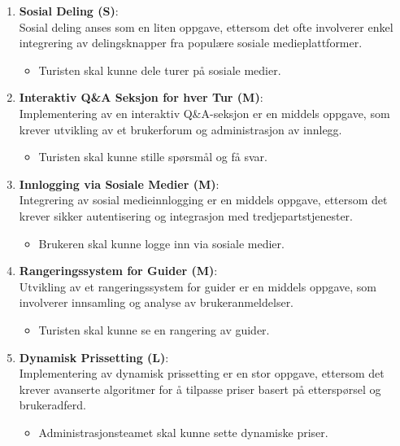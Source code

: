 \documentclass[../doc.tex]{subfiles}
\begin{document}
\begin{enumerate}
    \item \textbf{Sosial Deling (S)}: \\
    Sosial deling anses som en liten oppgave, ettersom det ofte involverer enkel integrering av delingsknapper fra populære sosiale medieplattformer.
    \begin{itemize}
        \item Turisten skal kunne dele turer på sosiale medier.
    \end{itemize}

    \item \textbf{Interaktiv Q\&A Seksjon for hver Tur (M)}: \\
    Implementering av en interaktiv Q\&A-seksjon er en middels oppgave, som krever utvikling av et brukerforum og administrasjon av innlegg.
    \begin{itemize}
        \item Turisten skal kunne stille spørsmål og få svar.
    \end{itemize}

    \item \textbf{Innlogging via Sosiale Medier (M)}: \\
    Integrering av sosial medieinnlogging er en middels oppgave, ettersom det krever sikker autentisering og integrasjon med tredjepartstjenester.
    \begin{itemize}
        \item Brukeren skal kunne logge inn via sosiale medier.
    \end{itemize}

    \item \textbf{Rangeringssystem for Guider (M)}: \\
    Utvikling av et rangeringssystem for guider er en middels oppgave, som involverer innsamling og analyse av brukeranmeldelser.
    \begin{itemize}
        \item Turisten skal kunne se en rangering av guider.
    \end{itemize}

    \item \textbf{Dynamisk Prissetting (L)}: \\
    Implementering av dynamisk prissetting er en stor oppgave, ettersom det krever avanserte algoritmer for å tilpasse priser basert på etterspørsel og brukeradferd.
    \begin{itemize}
        \item Administrasjonsteamet skal kunne sette dynamiske priser.
    \end{itemize}
\end{enumerate}
\end{document}
